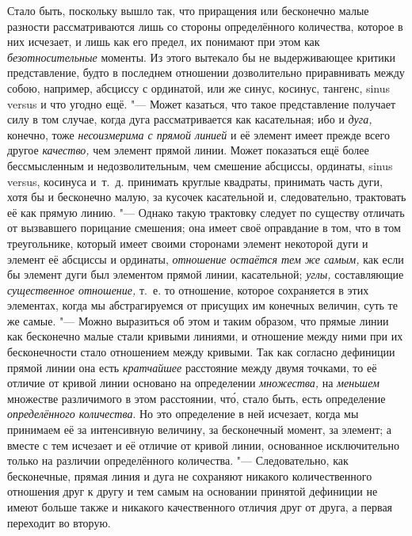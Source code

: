 Стало быть, поскольку вышло так, что приращения или бесконечно малые разности
рассматриваются лишь со стороны определённого количества, которое в них
исчезает, и лишь как его предел, их понимают при этом как
{\em безотносительные} моменты. Из этого вытекало бы не выдерживающее критики
представление, будто в последнем отношении дозволительно приравнивать между
собою, например, абсциссу с ординатой, или же синус, косинус, тангенс, sinus
versus и что угодно ещё. "--- Может казаться, что такое представление получает
силу в том случае, когда дуга рассматривается как касательная; ибо и {\em дуга,}
конечно, тоже {\em несоизмерима с прямой линией} и её элемент имеет прежде
всего другое {\em качество,} чем элемент прямой линии. Может показаться ещё
более бессмысленным и недозволительным, чем смешение абсциссы, ординаты, sinus
versus, косинуса и~т.~д. принимать круглые квадраты, принимать часть дуги, хотя
бы и бесконечно малую, за кусочек касательной и, следовательно, трактовать её
как прямую линию. "--- Однако такую трактовку следует по существу отличать от
вызвавшего порицание смешения; она имеет своё оправдание в том, что в том
треугольнике, который имеет своими сторонами элемент некоторой дуги и элемент
её абсциссы и ординаты, {\em отношение остаётся тем же самым,} как если бы
элемент дуги был элементом прямой линии, касательной; {\em углы,} составляющие
{\em существенное отношение,} т.~е. то отношение, которое сохраняется в этих
элементах, когда мы абстрагируемся от присущих им конечных величин, суть те же
самые. "--- Можно выразиться об этом и таким образом, что прямые линии как
бесконечно малые стали кривыми линиями, и отношение между ними при их
бесконечности стало отношением между кривыми. Так как согласно дефиниции прямой
линии она есть {\em кратчайшее} расстояние между двумя точками, то её отличие
от кривой линии основано на определении {\em множества,} на {\em меньшем}
множестве различимого в этом расстоянии, чт\'{о}, стало быть, есть
определение {\em определённого количества}. Но это определение в ней исчезает, когда мы
принимаем её за интенсивную величину, за бесконечный момент, за элемент; а
вместе с тем исчезает и её отличие от кривой линии, основанное исключительно
только на различии определённого количества. "--- Следовательно, как
бесконечные, прямая линия и дуга не сохраняют никакого количественного
отношения друг к другу и тем самым на основании принятой дефиниции не имеют
больше также и никакого качественного отличия друг от друга, а первая переходит
во вторую.

